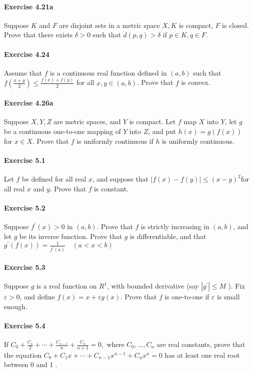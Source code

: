 \documentclass{article}
\begin{document}
\paragraph{Exercise 4.21a} Suppose $K$ and $F$ are disjoint sets in a metric space $X, K$ is compact, $F$ is closed. Prove that there exists $\delta>0$ such that $d(p, q)>\delta$ if $p \in K, q \in F$.

\paragraph{Exercise 4.24} Assume that $f$ is a continuous real function defined in $(a, b)$ such that $f\left(\frac{x+y}{2}\right) \leq \frac{f(x)+f(y)}{2}$ for all $x, y \in(a, b)$. Prove that $f$ is convex.

\paragraph{Exercise 4.26a} Suppose $X, Y, Z$ are metric spaces, and $Y$ is compact. Let $f$ map $X$ into $Y$, let $g$ be a continuous one-to-one mapping of $Y$ into $Z$, and put $h(x)=g(f(x))$ for $x \in X$. Prove that $f$ is uniformly continuous if $h$ is uniformly continuous.

\paragraph{Exercise 5.1} Let $f$ be defined for all real $x$, and suppose that $|f(x)-f(y)| \leq(x-y)^{2}$for all real $x$ and $y$. Prove that $f$ is constant.

\paragraph{Exercise 5.2} Suppose $f^{\prime}(x)>0$ in $(a, b)$. Prove that $f$ is strictly increasing in $(a, b)$, and let $g$ be its inverse function. Prove that $g$ is differentiable, and that$g^{\prime}(f(x))=\frac{1}{f^{\prime}(x)} \quad(a<x<b)$

\paragraph{Exercise 5.3} Suppose $g$ is a real function on $R^{1}$, with bounded derivative (say $\left|g^{\prime}\right| \leq M$ ). Fix $\varepsilon>0$, and define $f(x)=x+\varepsilon g(x)$. Prove that $f$ is one-to-one if $\varepsilon$ is small enough.

\paragraph{Exercise 5.4} If $C_{0}+\frac{C_{1}}{2}+\cdots+\frac{C_{n-1}}{n}+\frac{C_{n}}{n+1}=0,$ where $C_{0}, \ldots, C_{n}$ are real constants, prove that the equation $C_{0}+C_{1} x+\cdots+C_{n-1} x^{n-1}+C_{n} x^{n}=0$ has at least one real root between 0 and 1 .
\end{document}
